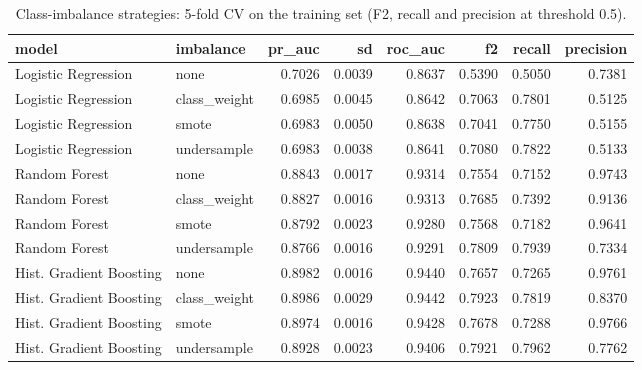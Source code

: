 \begin{table}[H]
\centering
\scriptsize
\begin{adjustbox}{max width=\linewidth}
\begin{tabular}{llrrrrrr}
\toprule
model & imbalance & pr\_auc & sd & roc\_auc & f2 & recall & precision \\
\midrule
Logistic Regression & none & 0.7026 & 0.0039 & 0.8637 & 0.5390 & 0.5050 & 0.7381 \\
Logistic Regression & class\_weight & 0.6985 & 0.0045 & 0.8642 & 0.7063 & 0.7801 & 0.5125 \\
Logistic Regression & smote & 0.6983 & 0.0050 & 0.8638 & 0.7041 & 0.7750 & 0.5155 \\
Logistic Regression & undersample & 0.6983 & 0.0038 & 0.8641 & 0.7080 & 0.7822 & 0.5133 \\
Random Forest & none & 0.8843 & 0.0017 & 0.9314 & 0.7554 & 0.7152 & 0.9743 \\
Random Forest & class\_weight & 0.8827 & 0.0016 & 0.9313 & 0.7685 & 0.7392 & 0.9136 \\
Random Forest & smote & 0.8792 & 0.0023 & 0.9280 & 0.7568 & 0.7182 & 0.9641 \\
Random Forest & undersample & 0.8766 & 0.0016 & 0.9291 & 0.7809 & 0.7939 & 0.7334 \\
Hist. Gradient Boosting & none & 0.8982 & 0.0016 & 0.9440 & 0.7657 & 0.7265 & 0.9761 \\
Hist. Gradient Boosting & class\_weight & 0.8986 & 0.0029 & 0.9442 & 0.7923 & 0.7819 & 0.8370 \\
Hist. Gradient Boosting & smote & 0.8974 & 0.0016 & 0.9428 & 0.7678 & 0.7288 & 0.9766 \\
Hist. Gradient Boosting & undersample & 0.8928 & 0.0023 & 0.9406 & 0.7921 & 0.7962 & 0.7762 \\
\bottomrule
\end{tabular}
\end{adjustbox}
\caption{Class-imbalance strategies: 5-fold CV on the training set (F2, recall and precision at threshold 0.5).}
\label{tab:suite_imbalance}
\end{table}
